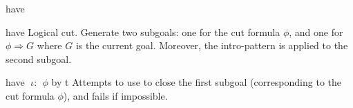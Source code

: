\begin{tactic}{have}
  \begin{tsyntax}[empty]{have}
  Logical cut. Generate two subgoals: one for the cut formula $\phi$,
  and one for $\phi \Rightarrow G$ where $G$ is the current goal. Moreover,
  the intro-pattern \ec{$\iota$} is applied to the second subgoal.
  \end{tsyntax}

  \begin{tsyntax}{have $\;\iota$: $\;\phi$ by t}
  Attempts to use  to close the first subgoal (corresponding to
  the cut formula $\phi$), and fails if impossible.
  \end{tsyntax}
\end{tactic}

